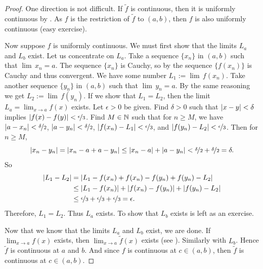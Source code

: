 \begin{proof}
One direction is not difficult.  If $\widetilde{f}$ is continuous, then
it is uniformly continuous by .  As $f$ is the
restriction of $\widetilde{f}$ to $(a,b)$, then $f$ is also uniformly continuous
(easy exercise).

Now suppose $f$ is uniformly continuous.  We must first show
that the limits $L_a$ and $L_b$ exist.  Let us concentrate on $L_a$.
Take a sequence $\{ x_n \}$ in $(a,b)$ such that $\lim\, x_n = a$.
The sequence $\{ x_n \}$ is Cauchy, so by
the sequence $\{ f(x_n) \}$ is Cauchy and thus convergent.
We have some number $L_1 := \lim\, f(x_n)$.  Take another sequence
$\{ y_n \}$ in $(a,b)$ such that $\lim\, y_n = a$.  By the same reasoning
we get $L_2 := \lim\, f(y_n)$.  If we show that $L_1 = L_2$, then
the limit $L_a = \lim_{x\to a} f(x)$ exists.  Let $\epsilon > 0$ be given.
Find $\delta > 0$ such that $\left\lvert {x-y} \right\rvert < \delta$ implies $\left\lvert {f(x)-f(y)} \right\rvert <
\nicefrac{\epsilon}{3}$.  Find $M \in {\mathbb{N}}$ such that for
$n \geq M$, we have $\left\lvert {a-x_n} \right\rvert < \nicefrac{\delta}{2}$,
$\left\lvert {a-y_n} \right\rvert < \nicefrac{\delta}{2}$,
$\left\lvert {f(x_n)-L_1} \right\rvert < \nicefrac{\epsilon}{3}$, and
$\left\lvert {f(y_n)-L_2} \right\rvert < \nicefrac{\epsilon}{3}$.  Then for $n \geq M$,
\begin{equation*}
\left\lvert {x_n-y_n} \right\rvert = 
\left\lvert {x_n-a+a-y_n} \right\rvert \leq
\left\lvert {x_n-a} \right\rvert+\left\lvert {a-y_n} \right\rvert < \nicefrac{\delta}{2} + \nicefrac{\delta}{2} =
\delta.
\end{equation*}
So
\begin{equation*}
\begin{split}
\left\lvert {L_1-L_2} \right\rvert &=
\left\lvert {L_1-f(x_n)+f(x_n)-f(y_n)+f(y_n)-L_2} \right\rvert \\
& \leq 
\left\lvert {L_1-f(x_n)} \right\rvert+\left\lvert {f(x_n)-f(y_n)} \right\rvert+\left\lvert {f(y_n)-L_2} \right\rvert \\
& \leq
\nicefrac{\epsilon}{3} + \nicefrac{\epsilon}{3} + \nicefrac{\epsilon}{3}
=
\epsilon .
\end{split}
\end{equation*}
Therefore, $L_1 = L_2$.
Thus $L_a$ exists.  To show that $L_b$ exists is left as an exercise.

Now that we know that the
limits $L_a$ and $L_b$ exist, we are done.  If $\lim_{x\to a} f(x)$
exists, then $\lim_{x\to a} \widetilde{f}(x)$ exists
(see ).  Similarly with $L_b$.
Hence $\widetilde{f}$ is continuous at $a$ and $b$.  
And since $f$ is continuous at $c \in (a,b)$, then
$\widetilde{f}$ is continuous at $c \in (a,b)$.
\end{proof}

